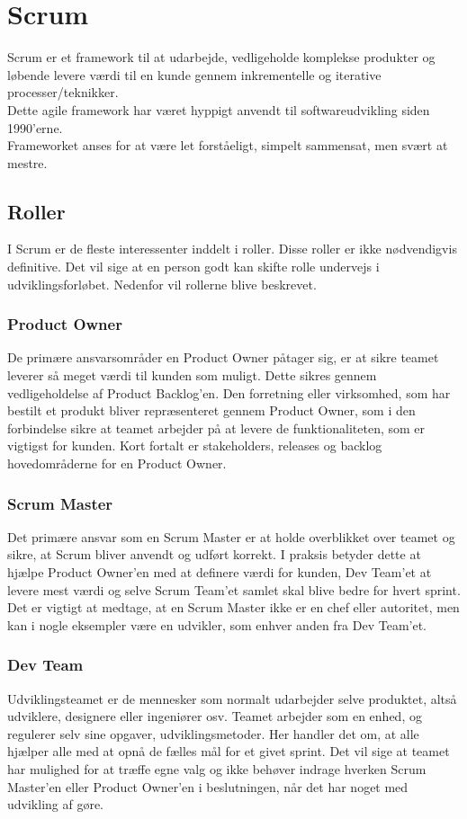 \section{Scrum}\label{sec:scrum}
Scrum er et framework til at udarbejde, vedligeholde komplekse produkter og løbende levere 
værdi til en kunde gennem inkrementelle og iterative processer/teknikker. \\

Dette agile framework har været hyppigt anvendt til softwareudvikling siden 1990’erne. \\

Frameworket anses for at være let forståeligt, simpelt sammensat, men svært at mestre.

\subsection{Roller}
I Scrum er de fleste interessenter inddelt i roller. Disse roller er ikke nødvendigvis definitive. Det vil sige at
en person godt kan skifte rolle undervejs i udviklingsforløbet. Nedenfor vil rollerne blive beskrevet.

\subsubsection{Product Owner}
De primære ansvarsområder en Product Owner påtager sig, er at sikre teamet leverer så 
meget værdi til kunden som muligt. Dette sikres gennem vedligeholdelse af Product Backlog’en. 
Den forretning eller virksomhed, som har bestilt et produkt bliver repræsenteret gennem 
Product Owner, som i den forbindelse sikre at teamet arbejder på at levere de funktionaliteten, 
som er vigtigst for kunden. Kort fortalt er stakeholders, releases og backlog hovedområderne for en Product Owner.

\subsubsection{Scrum Master}
Det primære ansvar som en Scrum Master er at holde overblikket over teamet og sikre, at Scrum bliver anvendt 
og udført korrekt. I praksis betyder dette at hjælpe Product Owner’en med at definere værdi for kunden, 
Dev Team’et at levere mest værdi og selve Scrum Team’et samlet skal blive bedre for hvert sprint. 
Det er vigtigt at medtage, at en Scrum Master ikke er en chef eller autoritet, men kan i nogle eksempler 
være en udvikler, som enhver anden fra Dev Team’et.

\subsubsection{Dev Team}
Udviklingsteamet er de mennesker som normalt udarbejder selve produktet, altså udviklere, designere 
eller ingeniører osv. Teamet arbejder som en enhed, og regulerer selv sine opgaver, udviklingsmetoder. 
Her handler det om, at alle hjælper alle med at opnå de fælles mål for et givet sprint. Det vil sige 
at teamet har mulighed for at træffe egne valg og ikke behøver indrage hverken Scrum Master’en eller 
Product Owner’en i beslutningen, når det har noget med udvikling af gøre.

